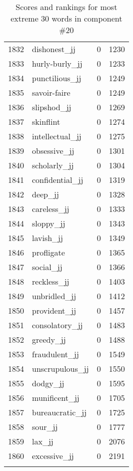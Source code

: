 \begin{longtable}[!htbp]{| rlr@{.}l |}
    1832 & dishonest\_jj & 0 & 1230 \\
    1833 & hurly-burly\_jj & 0 & 1233 \\
    1834 & punctilious\_jj & 0 & 1249 \\
    1835 & savoir-faire & 0 & 1249 \\
    1836 & slipshod\_jj & 0 & 1269 \\
    1837 & skinflint & 0 & 1274 \\
    1838 & intellectual\_jj & 0 & 1275 \\
    1839 & obsessive\_jj & 0 & 1301 \\
    1840 & scholarly\_jj & 0 & 1304 \\
    1841 & confidential\_jj & 0 & 1319 \\
    1842 & deep\_jj & 0 & 1328 \\
    1843 & careless\_jj & 0 & 1333 \\
    1844 & sloppy\_jj & 0 & 1343 \\
    1845 & lavish\_jj & 0 & 1349 \\
    1846 & profligate & 0 & 1365 \\
    1847 & social\_jj & 0 & 1366 \\
    1848 & reckless\_jj & 0 & 1403 \\
    1849 & unbridled\_jj & 0 & 1412 \\
    1850 & provident\_jj & 0 & 1457 \\
    1851 & consolatory\_jj & 0 & 1483 \\
    1852 & greedy\_jj & 0 & 1488 \\
    1853 & fraudulent\_jj & 0 & 1549 \\
    1854 & unscrupulous\_jj & 0 & 1550 \\
    1855 & dodgy\_jj & 0 & 1595 \\
    1856 & munificent\_jj & 0 & 1705 \\
    1857 & bureaucratic\_jj & 0 & 1725 \\
    1858 & sour\_jj & 0 & 1777 \\
    1859 & lax\_jj & 0 & 2076 \\
    1860 & excessive\_jj & 0 & 2191 \\
    \hline
    \caption{Scores and rankings for most extreme 30 words in component \#20} \\
\end{longtable}
